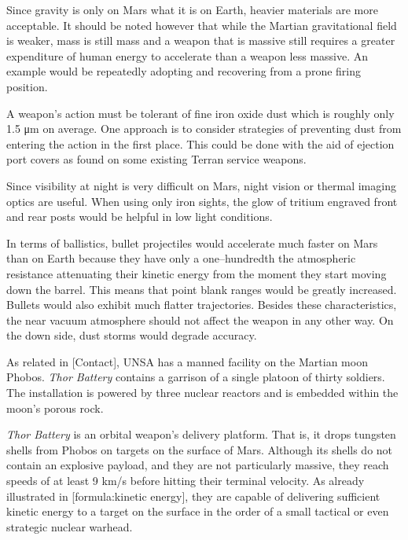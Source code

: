 Since gravity is only  on Mars what it is on Earth, heavier materials are more acceptable. It should be noted however that while the Martian gravitational field is weaker, mass is still mass and a weapon that is massive still requires a greater expenditure of human energy to accelerate than a weapon less massive. An example would be repeatedly adopting and recovering from a prone firing position.

A weapon's action must be tolerant of fine iron oxide dust which is roughly only 1.5 μm on average. One approach is to consider strategies of preventing dust from entering the action in the first place. This could be done with the aid of ejection port covers as found on some existing Terran service weapons.

Since visibility at night is very difficult on Mars, night vision or thermal imaging optics are useful. When using only iron sights, the glow of tritium engraved front and rear posts would be helpful in low light conditions.

In terms of ballistics, bullet projectiles would accelerate much faster on Mars than on Earth because they have only a one--hundredth the atmospheric resistance attenuating their kinetic energy from the moment they start moving down the barrel. This means that point blank ranges would be greatly increased. Bullets would also exhibit much flatter trajectories. Besides these characteristics, the near vacuum atmosphere should not affect the weapon in any other way. On the down side, dust storms would degrade accuracy. 


As related in [Contact], UNSA has a manned facility on the Martian moon Phobos. {\it Thor Battery} contains a garrison of a single platoon of thirty soldiers. The installation is powered by three nuclear reactors and is embedded within the moon's porous rock.

{\it Thor Battery} is an orbital weapon's delivery platform. That is, it drops tungsten shells from Phobos on targets on the surface of Mars. Although its shells do not contain an explosive payload, and they are not particularly massive, they reach speeds of at least 9 km/s before hitting their terminal velocity. As already illustrated in [formula:kinetic energy], they are capable of delivering sufficient kinetic energy to a target on the surface in the order of a small tactical or even strategic nuclear warhead.


